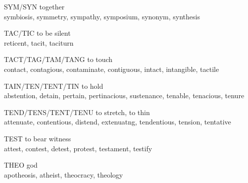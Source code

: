 \begin{flashcard}[Roots]{SYM/SYN}
together\\
\vspace{0.2in}
symbiosis, symmetry, sympathy, symposium, synonym, synthesis\\
\end{flashcard}

\begin{flashcard}[Roots]{TAC/TIC}
to be silent\\
\vspace{0.2in}
reticent, tacit, taciturn\\
\end{flashcard}

\begin{flashcard}[Roots]{TACT/TAG/TAM/TANG}
to touch\\
\vspace{0.2in}
contact, contagious, contaminate, contiguous, intact, intangible, tactile\\
\end{flashcard}

\begin{flashcard}[Roots]{TAIN/TEN/TENT/TIN}
to hold\\
\vspace{0.2in}
abstention, detain, pertain, pertinacious, sustenance, tenable, tenacious, tenure\\
\end{flashcard}

\begin{flashcard}[Roots]{TEND/TENS/TENT/TENU}
to stretch, to thin\\
\vspace{0.2in}
attenuate, contentious, distend, extenuatng, tendentious, tension, tentative\\
\end{flashcard}

\begin{flashcard}[Roots]{TEST}
to bear witness\\
\vspace{0.2in}
attest, contest, detest, protest, testament, testify\\
\end{flashcard}

\begin{flashcard}[Roots]{THEO}
god\\
\vspace{0.2in}
apotheosis, atheist, theocracy, theology\\
\end{flashcard}


